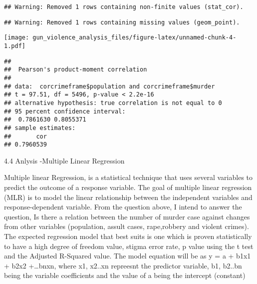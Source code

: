 \documentclass[]{article}
\newenvironment{Shaded}{\begin{snugshade}}{\end{snugshade}}
\newcommand{\KeywordTok}[1]{\textcolor[rgb]{0.13,0.29,0.53}{\textbf{#1}}}
\newcommand{\StringTok}[1]{\textcolor[rgb]{0.31,0.60,0.02}{#1}}
\newcommand{\OperatorTok}[1]{\textcolor[rgb]{0.81,0.36,0.00}{\textbf{#1}}}
\newcommand{\NormalTok}[1]{#1}
\begin{document}
\begin{verbatim}
## Warning: Removed 1 rows containing non-finite values (stat_cor).
\end{verbatim}

\begin{verbatim}
## Warning: Removed 1 rows containing missing values (geom_point).
\end{verbatim}

\texttt{[image: gun\_violence\_analysis\_files/figure-latex/unnamed-chunk-4-1.pdf]}

\begin{Shaded}
\end{Shaded}

\begin{verbatim}
## 
##  Pearson's product-moment correlation
## 
## data:  corcrimeframe$population and corcrimeframe$murder
## t = 97.51, df = 5496, p-value < 2.2e-16
## alternative hypothesis: true correlation is not equal to 0
## 95 percent confidence interval:
##  0.7861630 0.8055371
## sample estimates:
##       cor 
## 0.7960539
\end{verbatim}

4.4 Anlysis -Multiple Linear Regression

Multiple linear Regression, is a statistical technique that uses several
variables to predict the outcome of a response variable. The goal of
multiple linear regression (MLR) is to model the linear relationship
between the independent variables and response-dependent variable. From
the question above, I intend to answer the question, Is there a relation
between the number of murder case against changes from other variables
(population, assult cases, rape,robbery and violent crimes). The
expected regression model that best suits is one which is proven
statistically to have a high degree of freedom value, stigma error rate,
p value using the t test and the Adjusted R-Squared value. The model
equation will be as y = a + b1x1 + b2x2 +\ldots{}bnxn, where x1, x2..xn
repreesnt the predictor variable, b1, b2..bn being the variable
coefficients and the value of a being the intercept (constant)
\end{document}
